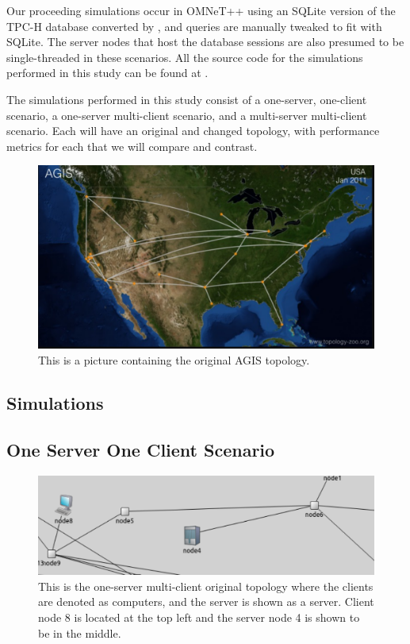 	Our proceeding simulations occur in OMNeT++ using an SQLite version of the TPC-H database converted by \cite{lovasoaTPCHsqlite}, and queries are manually tweaked to fit with SQLite. The server nodes that host the database sessions are also presumed to be single-threaded in these scenarios. All the source code for the simulations performed in this study can be found at \cite{alex21topology}.

	The simulations performed in this study consist of a one-server, one-client scenario, a one-server multi-client scenario, and a multi-server multi-client scenario. Each will have an original and changed topology, with performance metrics for each that we will compare and contrast.


\begin{figure}[tp]
\centering
\includegraphics[width=0.5 \textwidth]{figures/AGIS_ORIG}
\caption{This is a picture containing the original AGIS topology.
}
\end{figure}

\subsection{Simulations}

\subsection{One Server One Client Scenario}

\begin{figure}[tp]
\centering
\includegraphics[width=0.5 \textwidth]{figures/SingleClientOrig}
\caption{This is the one-server multi-client original topology where the clients are denoted as computers, and the server is shown as a server. Client node 8 is located at the top left and the server node 4 is shown to be in the middle.
}
\end{figure}


